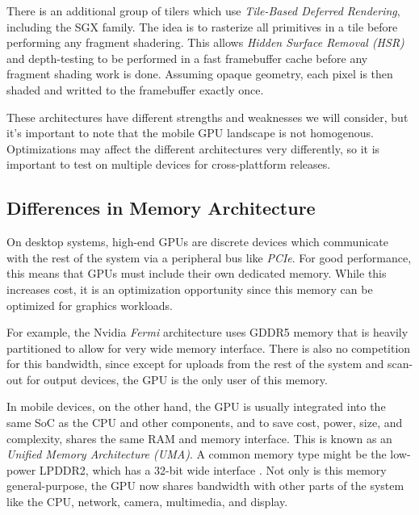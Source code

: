  There is an additional group of tilers
which use \textit{Tile-Based Deferred Rendering}, including the SGX family.
The idea is to rasterize all primitives in a tile before performing any
fragment shadering.  This allows \textit{Hidden Surface Removal (HSR)} and
depth-testing to be performed in a fast framebuffer cache before any fragment
shading work is done.  Assuming opaque geometry, each pixel is then shaded and
writted to the framebuffer exactly once.

These architectures have different strengths and weaknesses we will consider,
but it's important to note that the mobile GPU landscape is not homogenous.
Optimizations may affect the different architectures very differently, so it is
important to test on multiple devices for cross-plattform releases.
\subsection{Differences in Memory
Architecture}\label{Jon-McCaffrey:differences-in-memory-architecture}

On desktop systems, high-end GPUs are discrete devices which communicate with
the rest of the system via a peripheral bus like \textit{PCIe}.  For good
performance, this means that GPUs must include their own dedicated memory.
While this increases cost, it is an optimization opportunity since this memory
can be optimized for graphics workloads.

For example, the Nvidia \textit{Fermi} architecture uses GDDR5 memory that is
heavily partitioned \cite{Walton10} to allow for very wide memory interface.
There is also no competition for this bandwidth, since except for uploads from
the rest of the system and scan-out for output devices, the GPU is the only
user of this memory.

 

In mobile devices, on the other hand, the GPU is usually integrated into the
same SoC as the CPU and other components, and to save cost, power, size, and
complexity, shares the same RAM and memory interface.  This is known as an
\textit{Unified Memory Architecture (UMA)}.  A common memory type might be the
low-power LPDDR2, which has a 32-bit wide interface
\cite{anandtech_lg_optimus}.  Not only is this memory general-purpose, the GPU
now shares bandwidth with other parts of the system like the CPU, network,
camera, multimedia, and display.   


